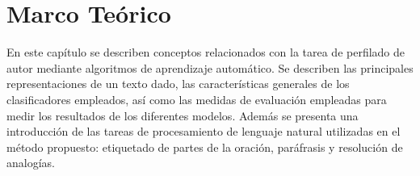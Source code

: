 \chapter{Marco Teórico}

En este capítulo se describen conceptos relacionados con la tarea de perfilado de autor mediante algoritmos de aprendizaje automático. Se describen las principales representaciones de un texto dado, las características generales de los clasificadores empleados, así como las medidas de evaluación empleadas para medir los resultados de los diferentes modelos. Además se presenta una introducción de las  tareas de procesamiento de lenguaje natural utilizadas en el método propuesto: etiquetado de partes de la oración, paráfrasis y resolución de analogías.







